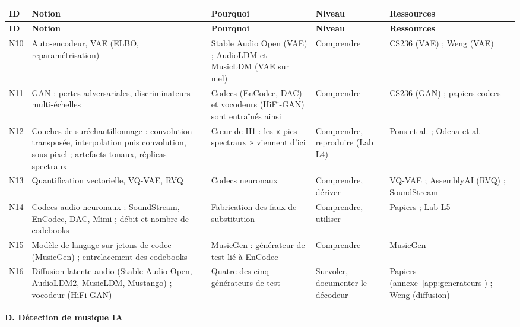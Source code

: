 \documentclass[11pt,a4paper]{article}
\begin{document}
{\small
\begin{longtable}{L{0.9cm}L{3.7cm}L{4.6cm}L{2.3cm}L{3.1cm}}
\toprule
\textbf{ID} & \textbf{Notion} & \textbf{Pourquoi} & \textbf{Niveau} & \textbf{Ressources}\\
\midrule
\endfirsthead
\toprule
\textbf{ID} & \textbf{Notion} & \textbf{Pourquoi} & \textbf{Niveau} & \textbf{Ressources}\\
\midrule
\endhead
\bottomrule
\endfoot
N10 & Auto-encodeur, VAE (ELBO, reparamétrisation) & Stable Audio Open (VAE) ; AudioLDM et MusicLDM (VAE sur mel) & Comprendre & CS236 (VAE) ; Weng (VAE)\\
N11 & GAN : pertes adversariales, discriminateurs multi-échelles & Codecs (EnCodec, DAC) et vocodeurs (HiFi-GAN) sont entraînés ainsi & Comprendre & CS236 (GAN) ; papiers codecs\\
N12 & Couches de suréchantillonnage : convolution transposée, interpolation puis convolution, sous-pixel ; artefacts tonaux, réplicas spectraux & C\oe ur de H1 : les « pics spectraux » viennent d'ici & Comprendre, reproduire (Lab L4) & Pons et al. ; Odena et al.\\
N13 & Quantification vectorielle, VQ-VAE, RVQ & Codecs neuronaux & Comprendre, dériver & VQ-VAE ; AssemblyAI (RVQ) ; SoundStream\\
N14 & Codecs audio neuronaux : SoundStream, EnCodec, DAC, Mimi ; débit et nombre de codebooks & Fabrication des faux de substitution & Comprendre, utiliser & Papiers ; Lab L5\\
N15 & Modèle de langage sur jetons de codec (MusicGen) ; entrelacement des codebooks & MusicGen : générateur de test lié à EnCodec & Comprendre & MusicGen\\
N16 & Diffusion latente audio (Stable Audio Open, AudioLDM2, MusicLDM, Mustango) ; vocodeur (HiFi-GAN) & Quatre des cinq générateurs de test & Survoler, documenter le décodeur & Papiers (annexe~\ref{app:generateurs}) ; Weng (diffusion)\\
\end{longtable}
}

\textbf{D. Détection de musique IA}
\end{document}
